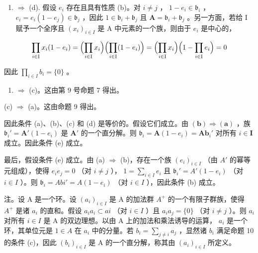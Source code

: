 \begin{enumerate}
\def\labelenumi{(\alph{enumi})}
\setcounter{enumi}{1}
\tightlist
\item
  \(\Rightarrow\) (d). 假设 \(e_i\) 存在且具有性质 (b)。对 \(i \neq j\) ， \(1 - e_i \in \mathfrak{b}_i\) ， \(e_i = e_i(1 - e_j) \in \mathfrak{b}_j\) ，因此 \(1 \in \mathfrak{b}_i + \mathfrak{b}_j\) 且 \(\mathbf{A} = \mathfrak{b}_i + \mathfrak{b}_j\) 。另一方面，若给 I 赋予一个全序且 \((x_i)_{i \in I}\) 是 A 中元素的一个族，则由于 \(e_i\) 是中心的，
\end{enumerate}

\[
\prod_ {i \in \mathrm{I}} x _ {i} (1 - e _ {i}) = \Bigl (\prod_ {i \in \mathrm{I}} x _ {i} \Bigr) \Bigl (\prod_ {i \in \mathrm{I}} (1 - e _ {i}) \Bigr) = \Bigl (\prod_ {i \in \mathrm{I}} x _ {i} \Bigr) \Bigl (1 - \prod_ {i \in \mathrm{I}} e _ {i} \Bigr) = 0
\]

因此 \(\prod_{i\in I}b_i = \{0\}\) 。

\begin{enumerate}
\def\labelenumi{(\alph{enumi})}
\setcounter{enumi}{3}
\item
  \(\Rightarrow\) (c)。这由第 9 号命题 7 得出。
\end{enumerate}

(c) \(\Rightarrow\) (a)。这由命题 9 得出。

因此条件 (a)、(b)、(c) 和 (d) 是等价的。假设它们成立。由 \((\mathbf{b}) \Rightarrow (\mathbf{a})\) ，族 \(\mathfrak{b}_i' = \mathbf{A}'(1 - e_i)\) 是 \(\mathbf{A}'\) 的一个直分解。则 \(\mathfrak{b}_i = \mathbf{A}(1 - e_i) = \mathbf{Ab}_i'\) 对所有 \(i \in \mathbf{I}\) 成立。因此条件 (e) 成立。

最后，假设条件 (e) 成立。由 (a) \(\Rightarrow\) (b)，存在一个族 \((e_i)_{i\in I}\) （由 \(A'\) 的幂等元组成），使得 \(e_i e_j = 0\) （对 \(i \neq j\) ）， \(1 = \sum_{i\in I} e_i\) 且 \(\mathfrak{b}_i' = A'(1 - e_i)\) （对 \(i \in I\) ）。则 \(\mathfrak{b}_i = Abi' = A(1 - e_i)\) （对 \(i \in I\) ），因此条件 (b) 成立。

注。设 A 是一个环。设 \((a_{i})_{i\in I}\) 是 A 的加法群 \(A^{+}\) 的一个有限子群族，使得 \(A^{+}\) 是诸 \(a_{i}\) 的直和。假设 \(a_{i}a_{i}\subset ai\) （对 \(i\in I\) ）且 \(a_{i}a_{j} = \{0\}\) （对 \(i\neq j\) ）。则 \(a_{i}\) 对所有 \(i\in I\) 是 A 的双边理想。以由 A 上的加法和乘法诱导的运算， \(a_{i}\) 是一个环，其单位元是 \(1\in A\) 在 \(a_{i}\) 中的分量。若 \(b_{i} = \sum_{j\neq i}a_{j}\) ，显然诸 \(b_{i}\) 满足命题 10 的条件 (c)，因此 \((b_{i})_{i\in I}\) 是 A 的一个直分解，称其由 \((a_{i})_{i\in I}\) 所定义。

